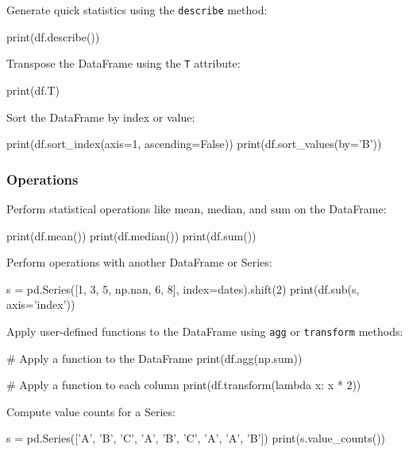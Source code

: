 Generate quick statistics using the \texttt{describe} method:

\begin{codeblock}[language=python]
    print(df.describe())
\end{codeblock}

Transpose the DataFrame using the \texttt{T} attribute:

\begin{codeblock}[language=python]
    print(df.T)
\end{codeblock}

Sort the DataFrame by index or value:

\begin{codeblock}[language=python]
    print(df.sort_index(axis=1, ascending=False))
    print(df.sort_values(by='B'))
\end{codeblock}

\subsubsection*{Operations}

Perform statistical operations like mean, median, and sum on the DataFrame:

\begin{codeblock}[language=python]
    print(df.mean())
    print(df.median())
    print(df.sum())
\end{codeblock}

Perform operations with another DataFrame or Series:

\begin{codeblock}[language=python]
    s = pd.Series([1, 3, 5, np.nan, 6, 8], index=dates).shift(2)
    print(df.sub(s, axis='index'))
\end{codeblock}

Apply user-defined functions to the DataFrame using \texttt{agg} or \texttt{transform} methods:

\begin{codeblock}[language=python]
    # Apply a function to the DataFrame
    print(df.agg(np.sum))

    # Apply a function to each column
    print(df.transform(lambda x: x * 2))
\end{codeblock}

Compute value counts for a Series:

\begin{codeblock}[language=python]
    s = pd.Series(['A', 'B', 'C', 'A', 'B', 'C', 'A', 'A', 'B'])
    print(s.value_counts())
\end{codeblock}

